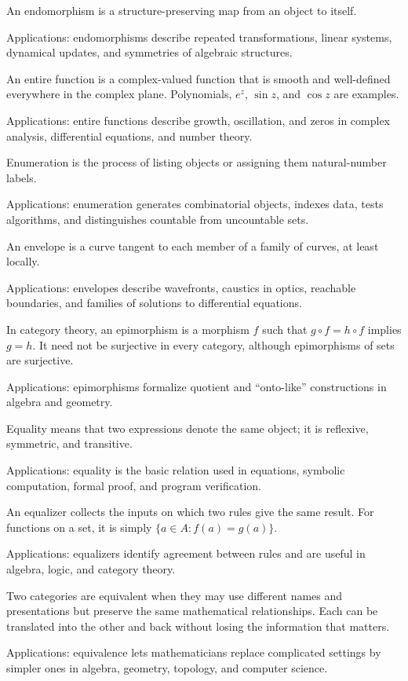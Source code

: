 An endomorphism is a structure-preserving map from an object to itself. \par\noindent Applications: endomorphisms describe repeated transformations, linear systems, dynamical updates, and symmetries of algebraic structures.

An entire function is a complex-valued function that is smooth and well-defined everywhere in the complex plane. Polynomials, $e^z$, $\sin z$, and $\cos z$ are examples. \par\noindent Applications: entire functions describe growth, oscillation, and zeros in complex analysis, differential equations, and number theory.

Enumeration is the process of listing objects or assigning them natural-number labels. \par\noindent Applications: enumeration generates combinatorial objects, indexes data, tests algorithms, and distinguishes countable from uncountable sets.

An envelope is a curve tangent to each member of a family of curves, at least locally. \par\noindent Applications: envelopes describe wavefronts, caustics in optics, reachable boundaries, and families of solutions to differential equations.

In category theory, an epimorphism is a morphism $f$ such that $g\circ f=h\circ f$ implies $g=h$. It need not be surjective in every category, although epimorphisms of sets are surjective. \par\noindent Applications: epimorphisms formalize quotient and “onto-like” constructions in algebra and geometry.

Equality means that two expressions denote the same object; it is reflexive, symmetric, and transitive. \par\noindent Applications: equality is the basic relation used in equations, symbolic computation, formal proof, and program verification.

An equalizer collects the inputs on which two rules give the same result. For functions on a set, it is simply $\{a\in A:f(a)=g(a)\}$. \par\noindent Applications: equalizers identify agreement between rules and are useful in algebra, logic, and category theory.

Two categories are equivalent when they may use different names and presentations but preserve the same mathematical relationships. Each can be translated into the other and back without losing the information that matters. \par\noindent Applications: equivalence lets mathematicians replace complicated settings by simpler ones in algebra, geometry, topology, and computer science.

